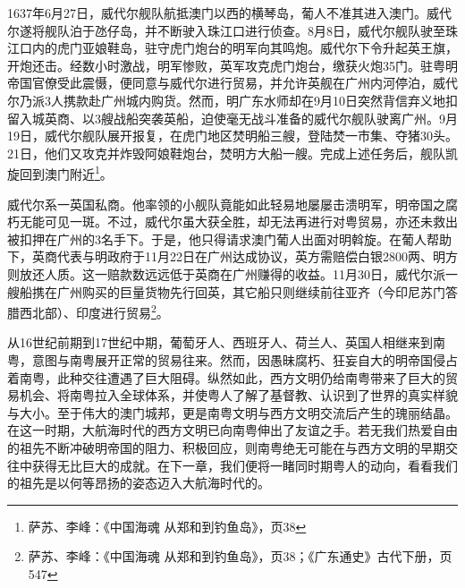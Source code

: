 1637年6月27日，威代尔舰队航抵澳门以西的横琴岛，葡人不准其进入澳门。威代尔遂将舰队泊于氹仔岛，并不断驶入珠江口进行侦查。8月8日，威代尔舰队驶至珠江口内的虎门亚娘鞋岛，驻守虎门炮台的明军向其鸣炮。威代尔下令升起英王旗，开炮还击。经数小时激战，明军惨败，英军攻克虎门炮台，缴获火炮35门。驻粤明帝国官僚受此震慑，便同意与威代尔进行贸易，并允许英舰在广州内河停泊，威代尔乃派3人携款赴广州城内购货。然而，明广东水师却在9月10日突然背信弃义地扣留入城英商、以3艘战船突袭英船，迫使毫无战斗准备的威代尔舰队驶离广州。9月19日，威代尔舰队展开报复，在虎门地区焚明船三艘，登陆焚一市集、夺猪30头。21日，他们又攻克并炸毁阿娘鞋炮台，焚明方大船一艘。完成上述任务后，舰队凯旋回到澳门附近\footnote{萨苏、李峰：《中国海魂 从郑和到钓鱼岛》，页38}。

威代尔系一英国私商。他率领的小舰队竟能如此轻易地屡屡击溃明军，明帝国之腐朽无能可见一斑。不过，威代尔虽大获全胜，却无法再进行对粤贸易，亦还未救出被扣押在广州的3名手下。于是，他只得请求澳门葡人出面对明斡旋。在葡人帮助下，英商代表与明政府于11月22日在广州达成协议，英方需赔偿白银2800两、明方则放还人质。这一赔款数远远低于英商在广州赚得的收益。11月30日，威代尔派一艘船携在广州购买的巨量货物先行回英，其它船只则继续前往亚齐（今印尼苏门答腊西北部）、印度进行贸易\footnote{萨苏、李峰：《中国海魂 从郑和到钓鱼岛》，页38；《广东通史》古代下册，页547}。

从16世纪前期到17世纪中期，葡萄牙人、西班牙人、荷兰人、英国人相继来到南粤，意图与南粤展开正常的贸易往来。然而，因愚昧腐朽、狂妄自大的明帝国侵占着南粤，此种交往遭遇了巨大阻碍。纵然如此，西方文明仍给南粤带来了巨大的贸易机会、将南粤拉入全球体系，并使粤人了解了基督教、认识到了世界的真实样貌与大小。至于伟大的澳门城邦，更是南粤文明与西方文明交流后产生的瑰丽结晶。在这一时期，大航海时代的西方文明已向南粤伸出了友谊之手。若无我们热爱自由的祖先不断冲破明帝国的阻力、积极回应，则南粤绝无可能在与西方文明的早期交往中获得无比巨大的成就。在下一章，我们便将一睹同时期粤人的动向，看看我们的祖先是以何等昂扬的姿态迈入大航海时代的。




